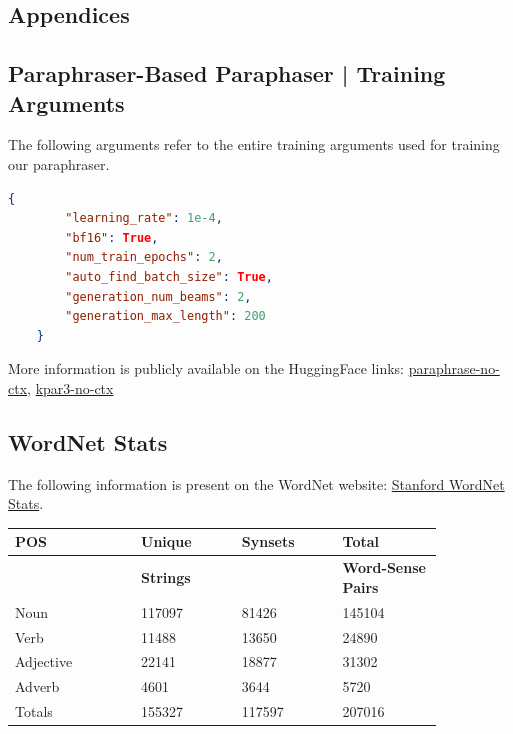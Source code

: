 \documentclass{l4proj}
\theoremstyle{definition}
\begin{document}
\begin{appendices}

\chapter{Appendices}
\section{Paraphraser-Based Paraphaser | Training Arguments}
    \label{append:training-args}
    The following arguments refer to the entire training arguments used for training our paraphraser.
    
    \begin{lstlisting}[language=json,firstnumber=1]
    {
        "learning_rate": 1e-4,
        "bf16": True,
        "num_train_epochs": 2,
        "auto_find_batch_size": True,
        "generation_num_beams": 2,
        "generation_max_length": 200
    }
    \end{lstlisting}
    More information is publicly available on the HuggingFace links: \href{https://huggingface.co/SamSJackson/paraphrase-dipper-no-ctx}{paraphrase-no-ctx}, \href{https://huggingface.co/datasets/SamSJackson/kpar3-no-ctx}{kpar3-no-ctx} 

\section{WordNet Stats}
    \label{append:wnet-stats}
    The following information is present on the WordNet website: \href{https://wordnet.princeton.edu/documentation/21-wnstats7wn}{Stanford WordNet Stats}.
    \begin{table}[ht]
        \centering
        \begin{tabular}{@{}p{0.25\linewidth}p{0.2\linewidth}p{0.2\linewidth}p{0.2\linewidth}@{}}
            \toprule
            \textbf{POS} & \textbf{Unique} & \textbf{Synsets} & \textbf{Total} \\ \midrule
             & \textbf{Strings} &  & \textbf{Word-Sense Pairs} \\ \midrule
            \multicolumn{1}{l|}{Noun} & 117097 & 81426 & 145104 \\
            \multicolumn{1}{l|}{Verb} & 11488 & 13650 & 24890 \\
            \multicolumn{1}{l|}{Adjective} & 22141 & 18877 & 31302 \\
            \multicolumn{1}{l|}{Adverb} & 4601 & 3644 & 5720 \\
            \multicolumn{1}{l|}{Totals} & 155327 & 117597 & 207016 \\ \bottomrule
        \end{tabular}
    \end{table}

\end{appendices}






\end{document}
